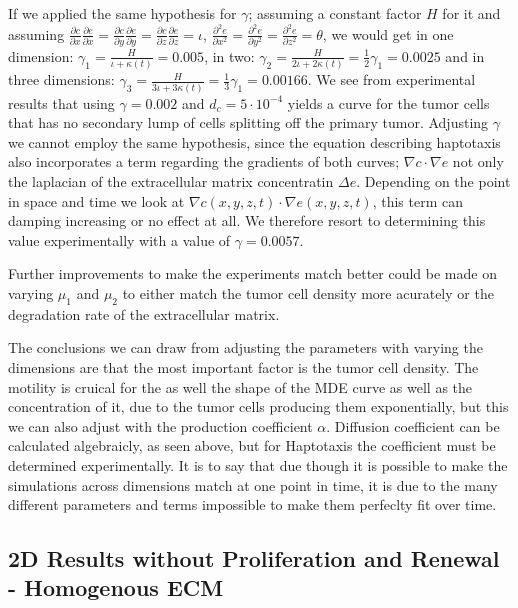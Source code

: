 If we applied the same hypothesis for $\gamma$; assuming a constant factor $H$ for it and assuming $\frac{\partial c}{\partial x}\frac{\partial e}{\partial x}=\frac{\partial c}{\partial y}\frac{\partial e}{\partial y}=\frac{\partial c}{\partial z}\frac{\partial e}{\partial z}=\iota$, $\frac{\partial^{2}e}{\partial x^{2}}=\frac{\partial^{2}e}{\partial y^{2}}=\frac{\partial^{2}e}{\partial z^{2}}=\theta$, we would get in one dimension: $\gamma_1 = \frac{H}{\iota + \kappa(t)} = 0.005$, in two: $\gamma_2 = \frac{H}{2\iota + 2\kappa(t)} = \frac{1}{2} \gamma_1 = 0.0025$ and in three dimensions: $\gamma_3 = \frac{H}{3\iota + 3\kappa(t)} = \frac{1}{3} \gamma_1 = 0.00166$. We see from experimental results that using $\gamma=0.002$ and $d_c=5\cdot 10^{-4}$ yields a curve for the tumor cells that has no secondary lump of cells splitting off the primary tumor. Adjusting $\gamma$ we cannot employ the same hypothesis, since the equation describing haptotaxis also incorporates a term regarding the gradients of both curves; $\nabla c \cdot \nabla e$ not only the laplacian of the extracellular matrix concentratin $\Delta e$. Depending on the point in space and time we look at $\nabla c(x,y,z,t) \cdot \nabla e(x,y,z,t)$, this term can damping increasing or no effect at all. We therefore resort to determining this value experimentally with a value of $\gamma=0.0057$.

Further improvements to make the experiments match better could be made on varying $\mu_1$ and $\mu_2$ to either match the tumor cell density more acurately or the degradation rate of the extracellular matrix.

The conclusions we can draw from adjusting the parameters with varying the dimensions are that the most important factor is the tumor cell density. The motility is cruical for the as well the shape of the MDE curve as well as the concentration of it, due to the tumor cells producing them exponentially, but this we can also adjust with the production coefficient $\alpha$. Diffusion coefficient can be calculated algebraicly, as seen above, but for Haptotaxis the coefficient must be determined experimentally. It is to say that due though it is possible to make the simulations across dimensions match at one point in time, it is due to the many different parameters and terms impossible to make them perfeclty fit over time.



\subsection{2D Results without Proliferation and Renewal - Homogenous ECM}
\label{sec:2D_without_proliferation}

